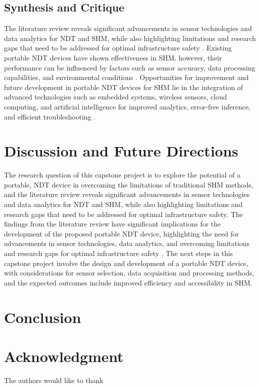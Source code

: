 \documentclass[journal, a4paper]{IEEEtran}
\begin{document}
\subsection{Synthesis and Critique}
The literature review reveals significant advancements in sensor technologies and data analytics
for NDT and SHM,
while also highlighting limitations and research gaps that need to be addressed for optimal infrastructure safety \cite{Vijayan2023} \cite{Hassani2023}.
Existing portable NDT devices have shown effectiveness in SHM,
however, their performance can be influenced by factors such as sensor accuracy, data processing capabilities,
and environmental conditions \cite{Vijayan2023} \cite{Hassani2023}.
Opportunities for improvement and future development in portable NDT devices
for SHM lie in the integration of advanced technologies such as embedded systems,
wireless sensors, cloud computing, and artificial intelligence for improved analytics, error-free inference,
and efficient troubleshooting \cite{Meier2018}.


\section{Discussion and Future Directions}  %
The research question of this capstone project is to explore the potential of a portable,
NDT device in overcoming the limitations of traditional SHM methods,
and the literature review reveals significant advancements in sensor technologies and data analytics for NDT and SHM,
while also highlighting limitations and research gaps that need to be addressed for optimal infrastructure safety.
The findings from the literature review have significant implications for the development of the
proposed portable NDT device, highlighting the need for advancements in sensor technologies,
data analytics, and overcoming limitations and research gaps for optimal infrastructure safety \cite{Udell2018} \cite{Meier2018}.
The next steps in this capstone project involve the design and development of a portable
NDT device, with considerations for sensor selection, data acquisition and processing methods,
and the expected outcomes include improved efficiency and accessibility in SHM.



\section{Conclusion}
\lipsum[1]


\section*{Acknowledgment}
The authors would like to thank \lipsum[1]



\ifCLASSOPTIONcaptionsoff
  \newpage
\fi






\end{document}
